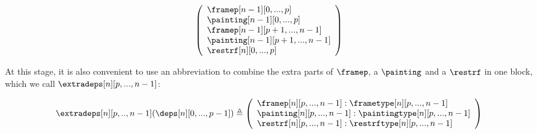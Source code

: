 \documentclass{msc}
\newcommand{\defeq}{\ensuremath{\triangleq}}
\begin{document}
\begin{equation*}
\begin{array}{llcl}
\begin{array}{c}
      \left(\begin{array}{l}
                \framep[n-1][0,...,p]       \\
                \painting[n-1][0,...,p]     \\
                \framep[n-1][p+1,...,n-1]   \\
                \painting[n-1][p+1,...,n-1] \\
                \restrf[n][0,...,p]         \\
              \end{array}\right)
    \end{array}
  \end{array}
\end{equation*}

At this stage, it is also convenient to use an abbreviation to combine the extra parts of $\framep$, a $\painting$ and a $\restrf$ in one block, which we call $\extradeps[n][p,...,n-1]$:

\begin{align*}
  \extradeps[n][p,..,n-1] (\deps[n][0,...,p-1]) \defeq
  \left(\begin{array}{l}
            \framep[n][p,...,n-1] :\frametype[n][p,...,n-1]      \\
            \painting[n][p,...,n-1] :\paintingtype[n][p,...,n-1] \\
            \restrf[n][p,...,n-1]  :\restrftype[n][p,...,n-1]    \\
          \end{array}\right)
\end{align*}
\end{document}
